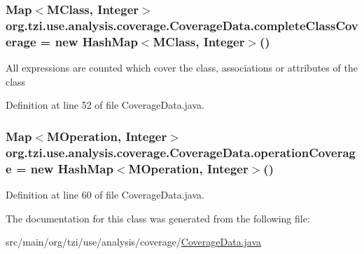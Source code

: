 \hypertarget{classorg_1_1tzi_1_1use_1_1analysis_1_1coverage_1_1_coverage_data_a6ebec40e9045adddb05a44d8acb53070}{
\subsubsection[{complete\-Class\-Coverage}]{\setlength{\rightskip}{0pt plus 5cm}Map$<${\bf M\-Class}, Integer$>$ org.\-tzi.\-use.\-analysis.\-coverage.\-Coverage\-Data.\-complete\-Class\-Coverage = new Hash\-Map$<${\bf M\-Class}, Integer$>$()\hspace{0.3cm}{\ttfamily [protected]}}}\label{classorg_1_1tzi_1_1use_1_1analysis_1_1coverage_1_1_coverage_data_a6ebec40e9045adddb05a44d8acb53070}
All expressions are counted which cover the class, associations or attributes of the class 

Definition at line 52 of file Coverage\-Data.\-java.

\hypertarget{classorg_1_1tzi_1_1use_1_1analysis_1_1coverage_1_1_coverage_data_a4bbfa0429081023f87fb921b33823450}{
\subsubsection[{operation\-Coverage}]{\setlength{\rightskip}{0pt plus 5cm}Map$<${\bf M\-Operation}, Integer$>$ org.\-tzi.\-use.\-analysis.\-coverage.\-Coverage\-Data.\-operation\-Coverage = new Hash\-Map$<${\bf M\-Operation}, Integer$>$()\hspace{0.3cm}{\ttfamily [protected]}}}\label{classorg_1_1tzi_1_1use_1_1analysis_1_1coverage_1_1_coverage_data_a4bbfa0429081023f87fb921b33823450}


Definition at line 60 of file Coverage\-Data.\-java.



The documentation for this class was generated from the following file\-:\begin{DoxyCompactItemize}
\item 
src/main/org/tzi/use/analysis/coverage/\hyperlink{_coverage_data_8java}{Coverage\-Data.\-java}\end{DoxyCompactItemize}
